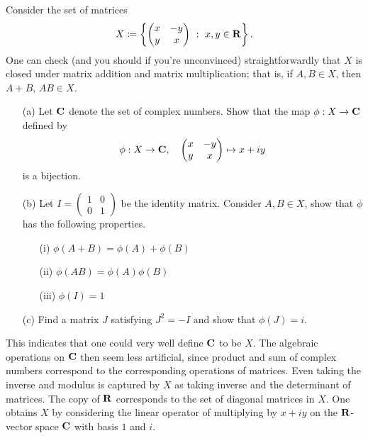 \begin{problem}[]\label{prob 1.1a}
Consider the set of matrices
\[X \coloneqq \left\{\begin{pmatrix}x & -y\\ y & x \end{pmatrix}\ :\ x,y \in \mathbf R\right\}.\]
One can check (and you should if you're unconvinced) straightforwardly that $X$ is closed under matrix addition and matrix multiplication; that is, if $A,B \in X$, then $A+B,\, AB \in X$.
\begin{itemize}[itemsep=1em]
\item[(a)] Let $\mathbf C$ denote the set of complex numbers. Show that the map $\phi: X \to \mathbf C$ defined by 
\[\phi:X \to \mathbf C,\quad \begin{pmatrix}x & -y\\ y & x \end{pmatrix} \mapsto x + iy\]
is a bijection. 
\item[(b)] Let $I = \begin{pmatrix}1 & 0\\ 0 & 1\end{pmatrix}$ be the identity matrix. Consider $A,B \in X$, show that $\phi$ has the following properties.
\begin{itemize}[itemsep=1em]
\item[(i)] $\phi(A+B) = \phi(A)+\phi(B)$
\item[(ii)] $\phi(AB) = \phi(A)\phi(B)$
\item[(iii)] $\phi(I) = 1$
\end{itemize}
\item[(c)] Find a matrix $J$ satisfying $J^2 = -I$ and show that $\phi(J) = i$.
\end{itemize}
\vspace*{0.05in}
\begin{remark}
This indicates that one could very well define $\mathbf C$ to be $X$. The algebraic operations on $\mathbf C$ then seem less artificial, since product and sum of complex numbers correspond to the corresponding operations of matrices. Even taking the inverse and modulus is captured by $X$ as taking inverse and the determinant of matrices. The copy of $\mathbf R$ corresponds to the set of diagonal matrices in $X$. One obtains $X$ by considering the linear operator of multiplying by $x + iy$ on the $\mathbf R$-vector space $\mathbf C$ with basis $1$ and $i$.
\end{remark}
\end{problem}

\vspace*{0.1in}


